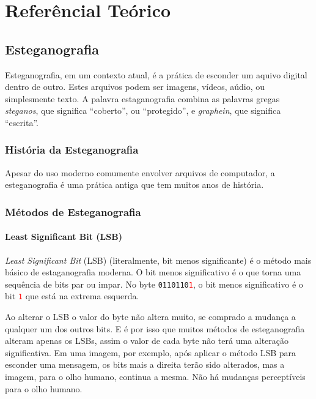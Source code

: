 \chapter{Referêncial Teórico}

\section{Esteganografia}

Esteganografia, em um contexto atual, é a prática de esconder um aquivo digital dentro de outro. Estes arquivos podem ser imagens, vídeos, aúdio, ou simplesmente texto. A palavra estaganografia combina as palavras gregas \emph{steganos}, que significa ``coberto'', ou ``protegido'', e \emph{graphein}, que significa ``escrita''.


\subsection{História da Esteganografia}

Apesar do uso moderno comumente envolver arquivos de computador, a esteganografia é uma prática antiga que tem muitos anos de história.


\subsection{Métodos de Esteganografia}

\subsubsection{Least Significant Bit (LSB)}

\emph{Least Significant Bit} (LSB) (literalmente, bit menos significante) é o método mais básico de estaganografia moderna. O bit menos significativo é o que torna uma sequência de bits par ou impar. No byte \texttt{0110110\textcolor{red}{1}}, o bit menos significativo é o bit \texttt{\textcolor{red}{1}} que está na extrema esquerda.

Ao alterar o LSB o valor do byte não altera muito, se comprado a mudança a qualquer um dos outros bits. E é por isso que muitos métodos de esteganografia alteram apenas os LSBs, assim o valor de cada byte não terá uma alteração significativa. Em uma imagem, por exemplo, após aplicar o método LSB para esconder uma mensagem, os bits mais a direita terão sido alterados, mas a imagem, para o olho humano, continua a mesma. Não há mudanças perceptíveis para o olho humano.

